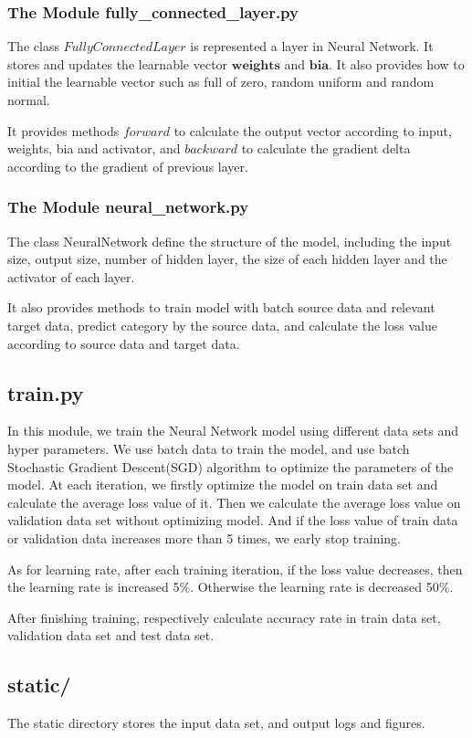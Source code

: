 \subsubsection{The Module fully\_connected\_layer.py}
The class \(FullyConnectedLayer\) is represented a layer in Neural Network. It stores and updates the learnable vector \(\boldsymbol{weights}\) and \(\boldsymbol{bia}\). It also provides how to initial the learnable vector such as full of zero, random uniform and random normal.

It provides methods \(forward\) to calculate the output vector according to input, weights, bia and activator, and \(backward\) to calculate the gradient delta according to the gradient of previous layer.
\subsubsection{The Module neural\_network.py}
The class NeuralNetwork define the structure of the model, including the input size, output size, number of hidden layer, the size of each hidden layer and the activator of each layer.

It also provides methods to train model with batch source data and relevant target data, predict category by the source data, and calculate the loss value according to source data and target data.

\subsection{train.py}
In this module, we train the Neural Network model using different data sets and hyper parameters. We use batch data to train the model, and use batch Stochastic Gradient Descent(SGD) algorithm to optimize the parameters of the  model. At each iteration, we firstly optimize the model on train data set and calculate the average loss value of it. Then we calculate the average loss value on validation data set without optimizing model. And if the loss value of train data or validation data increases more than 5 times, we early stop training.

As for learning rate, after each training iteration, if the loss value decreases, then the learning rate is increased 5\%. Otherwise the learning rate is decreased 50\%.

After finishing training, respectively calculate accuracy rate in train data set, validation data set and test data set.

\subsection{static/}
The static directory stores the input data set, and output logs and figures.


